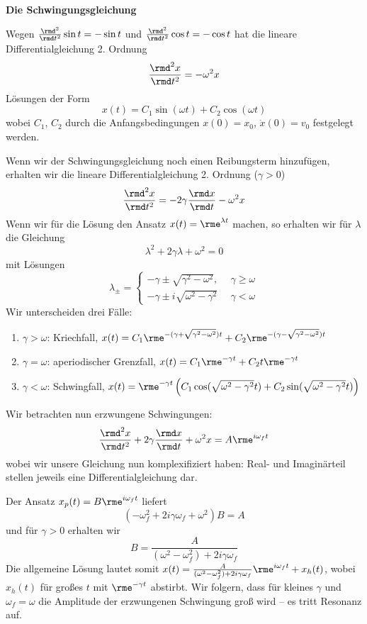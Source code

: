 \documentclass[a4paper,10pt]{article}
\begin{document}
{\bf Die Schwingungsgleichung}

Wegen $\frac{\rmd^2}{\rmd t^2}\sin t=-\sin t$ und
$\frac{\rmd^2}{\rmd t^2}\cos t=-\cos t$ hat die lineare
Differentialgleichung 2. Ordnung
\[
\frac{\rmd^2 x}{\rmd t^2} = -\omega^2 x
\]
Lösungen der Form
\[
x(t) = C_1 \sin(\omega t) + C_2 \cos(\omega t)
\]
wobei $C_1$, $C_2$ durch die Anfangsbedingungen
$x(0)=x_0$, $\dot{x}(0)=v_0$ festgelegt werden.

Wenn wir der Schwingungsgleichung noch einen Reibungsterm hinzufügen,
erhalten wir die lineare
Differentialgleichung 2. Ordnung ($\gamma>0$)
\[
\frac{\rmd^2 x}{\rmd t^2} = -2\gamma \frac{\rmd x}{\rmd t}-\omega^2 x
\]
Wenn wir für die Lösung den Ansatz $x(t)=\rme^{\lambda t}$ machen,
so erhalten wir für $\lambda$ die Gleichung
\[
\lambda^2+2\gamma\lambda+\omega^2=0
\]
mit Lösungen
\[
\lambda_\pm = \left\{\begin{array}{ll}
                     -\gamma\pm\sqrt{\gamma^2-\omega^2},&~~\gamma\ge\omega\\
                     -\gamma\pm i\sqrt{\omega^2-\gamma^2}&~~\gamma<\omega
                     \end{array}\right.
\]
Wir unterscheiden drei Fälle:
\begin{enumerate}
\item $\gamma>\omega$: Kriechfall, $x(t)=C_1\rme^{-(\gamma+\sqrt{\gamma^2-\omega^2})t}+C_2\rme^{-(\gamma-\sqrt{\gamma^2-\omega^2})t}$
\item $\gamma=\omega$: aperiodischer Grenzfall, $x(t)=C_1\rme^{-\gamma t}+C_2 t\rme^{-\gamma t}$
\item $\gamma<\omega$: Schwingfall, $x(t)=\rme^{-\gamma t}\left(C_1\cos(\sqrt{\omega^2-\gamma^2}t)+C_2\sin(\sqrt{\omega^2-\gamma^2}t)\right)$
\end{enumerate}

Wir betrachten nun erzwungene Schwingungen:
\[
\frac{\rmd^2 x}{\rmd t^2} + 2\gamma \frac{\rmd x}{\rmd t}+\omega^2 x= A\rme^{i\omega_f t}
\]
wobei wir unsere Gleichung nun komplexifiziert haben: Real- und Imaginärteil
stellen jeweils eine Differentialgleichung dar.

Der Ansatz $x_p(t)=B\rme^{i\omega_f t}$ liefert
\[
(-\omega_f^2+2i\gamma\omega_f+\omega^2)B=A
\]
und für $\gamma>0$ erhalten wir
\[
B=\frac{A}{(\omega^2-\omega_f^2)+2i\gamma\omega_f}
\]
Die allgemeine Lösung lautet somit $x(t) = \frac{A}{(\omega^2-\omega_f^2)+2i\gamma\omega_f}\rme^{i\omega_f t} + x_h(t)$, wobei $x_h(t)$ für großes $t$ mit $\rme^{-\gamma t}$ abstirbt.
%
Wir folgern, dass für kleines $\gamma$ und $\omega_f=\omega$
die Amplitude der erzwungenen Schwingung groß wird -- es tritt Resonanz auf.
\end{document}
